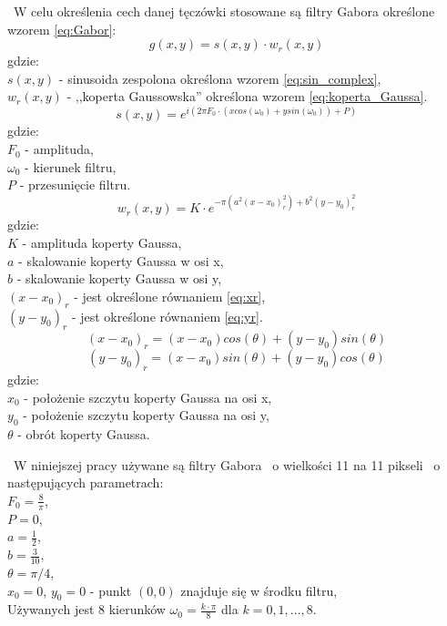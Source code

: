 ~W celu określenia cech danej tęczówki stosowane są filtry Gabora określone wzorem \ref{eq:Gabor}:
\begin{equation}
\label{eq:Gabor}
g(x,y) = s(x,y)\cdot w_{r}(x,y)
\end{equation}
gdzie:\\
$s(x,y)$ - sinusoida zespolona określona wzorem \ref{eq:sin_complex},\\
$w_{r}(x,y)$ - ,,koperta Gaussowska'' określona wzorem \ref{eq:koperta_Gaussa}.\\
\begin{equation}
\label{eq:sin_complex}
s(x,y) = e^{i(2 \pi F_{0} \cdot (xcos(\omega_{0}) + ysin(\omega_{0})) + P)}
\end{equation}
gdzie:\\
$F_{0}$ - amplituda,\\
$\omega_{0}$ - kierunek filtru,\\
$P$ - przesunięcie filtru.\\
\begin{equation}
\label{eq:koperta_Gaussa}
w_{r}(x,y) = K \cdot e^{-\pi(a^{2}(x-x_{0})_{r}^{2}) + b^{2}(y-y_{0})_{r}^{2}}
\end{equation}
gdzie:\\
$K$ - amplituda koperty Gaussa,\\
$a$ - skalowanie koperty Gaussa w osi x,\\
$b$ - skalowanie koperty Gaussa w osi y,\\
$(x-x_{0})_{r}$ - jest określone równaniem \ref{eq:xr},\\
$(y-y_{0})_{r}$ - jest określone równaniem \ref{eq:yr}.\\
\begin{equation}
\label{eq:xr}
(x-x_{0})_{r} = (x-x_{0})cos(\theta)+(y-y_{0})sin(\theta)
\end{equation}
\begin{equation}
\label{eq:yr}
(y-y_{0})_{r} = (x-x_{0})sin(\theta)+(y-y_{0})cos(\theta)
\end{equation}
gdzie:\\
$x_{0}$ - położenie szczytu koperty Gaussa na osi x,\\
$y_{0}$ - położenie szczytu koperty Gaussa na osi y,\\
$\theta$ - obrót koperty Gaussa.

~W niniejszej pracy używane są filtry Gabora ~o wielkości 11 na 11 pikseli ~o następujących parametrach:\\
$F_{0} = \frac{8}{\pi}$,\\
$P = 0$,\\
$a = \frac{1}{2}$,\\
$b = \frac{3}{10}$,\\
$\theta = \pi / 4$,\\
$x_{0} = 0$, $y_{0} = 0$ - punkt $(0,0)$ znajduje się w środku filtru,\\
Używanych jest 8 kierunków $\omega_{0} =\frac {k \cdot \pi} {8} $ dla $k = 0, 1, ..., 8$.

